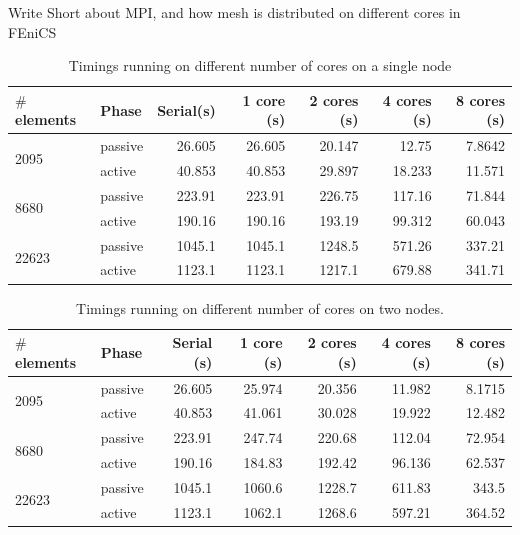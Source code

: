 Write Short about MPI, and how mesh is distributed on different
cores in FEniCS


\begin{table}
  \centering
    \begin{tabular}{llrrrrr}
\hline
   $\#$ elements & Phase & Serial(s) & 1 core (s)& 2 cores (s) &  4 cores (s)&  8 cores (s)\\
\hline
      \multirow{2}{*}{2095} & passive &   26.605 &   26.605 &   20.147 &  12.75 &   7.8642 \\
                      & active &    40.853 &   40.853 &   29.897 &  18.233 &  11.571 \\
      \multirow{2}{*}{8680} & passive & 223.91  &  223.91  &  226.75  & 117.16 &  71.844  \\
                      & active &   190.16  &  190.16  &  193.19  &  99.312 &  60.043 \\
      \multirow{2}{*}{22623} & passive &   1045.1   & 1045.1   & 1248.5   & 571.26 & 337.21   \\
                         & active &   1123.1   & 1123.1   & 1217.1   & 679.88  & 341.71  \\
\hline
    \end{tabular}
    \caption{\label{}Timings running on different number of cores on a
      single node}
  \end{table}


\begin{table}
  \centering
    \begin{tabular}{llrrrrr}
\hline
   $\#$ elements & Phase & Serial (s)& 1 core (s)& 2 cores (s) &  4 cores (s)&  8 cores (s)\\
\hline
      \multirow{2}{*}{2095} & passive &   26.605 &   25.974 &   20.356 &  11.982 &   8.1715 \\
                      & active &   40.853 &   41.061 &   30.028 &  19.922 &  12.482 \\
      \multirow{2}{*}{8680} & passive & 223.91  &  247.74  &  220.68  & 112.04  &  72.954  \\
                      & active &  190.16  &  184.83  &  192.42  &  96.136 &  62.537 \\
      \multirow{2}{*}{22623} & passive &  1045.1   & 1060.6   & 1228.7   & 611.83  & 343.5    \\
                         & active &  1123.1   & 1062.1   & 1268.6   & 597.21  & 364.52  \\
\hline
    \end{tabular}
    \caption{\label{}Timings running on different number of cores
      on two nodes.}
  \end{table}
